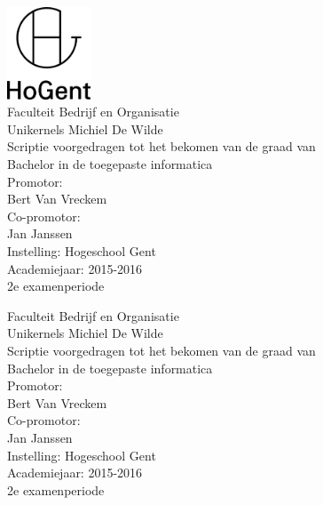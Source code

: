 \documentclass[pdftex,a4paper,12pt,twoside]{report}
\newcommand{\emptypage}{
\newpage
\thispagestyle{empty}
\mbox{}
\newpage
}
\newcommand{\student}{Michiel De Wilde}
\newcommand{\promotor}{Bert Van Vreckem}
\newcommand{\copromotor}{Jan Janssen}
\newcommand{\instelling}{Hogeschool Gent}
\newcommand{\titel}{Unikernels}
\newcommand{\faculteit}{Faculteit Bedrijf en Organisatie}
\newcommand{\rapporttype}{Scriptie voorgedragen tot het bekomen van de graad van\\Bachelor in de toegepaste informatica}
\newcommand{\academiejaar}{2015-2016}
\newcommand{\examenperiode}{2e examenperiode}
\begin{document}

\begin{titlepage}
  \begin{center}

    \begingroup
    \rmfamily
    \includegraphics[width=2.5cm]{img/HG-beeldmerk-woordmerk}\\[.5cm]
    \faculteit\\[3cm]
    \titel
    \vfill
    \student\\[3.5cm]
    \rapporttype\\[2cm]
    Promotor:\\
    \promotor\\
    Co-promotor:\\
    \copromotor\\[2.5cm]
    Instelling: \instelling\\[.5cm]
    Academiejaar: \academiejaar\\[.5cm]
    \examenperiode
    \endgroup

  \end{center}
  \restoregeometry
\end{titlepage}


\emptypage


\begin{titlepage}
  \begin{center}

    \begingroup
    \rmfamily
    \faculteit\\[3cm]
    \titel
    \vfill
    \student\\[3.5cm]
    \rapporttype\\[2cm]
    Promotor:\\
    \promotor\\
    Co-promotor:\\
    \copromotor\\[2.5cm]
    Instelling: \instelling\\[.5cm]
    Academiejaar: \academiejaar\\[.5cm]
    \examenperiode
    \endgroup

  \end{center}
  \restoregeometry
\end{titlepage}
\end{document}
